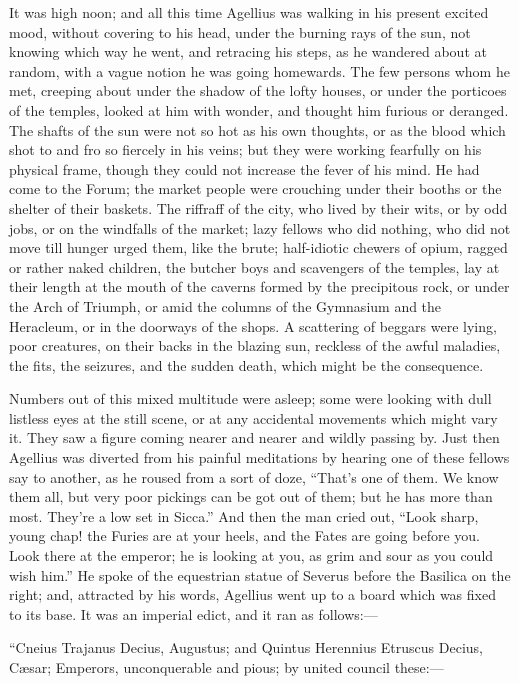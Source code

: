 It was high noon; and all this time Agellius was walking in his
present excited mood, without covering to his head, under the burning
rays of the sun, not knowing which way he went, and retracing his
steps, as he wandered about at random, with a vague notion he was
going homewards. The few persons whom he met, creeping about under the
shadow of the lofty houses, or under the porticoes of the temples,
looked at him with wonder, and thought him furious or deranged. The
shafts of the sun were not so hot as his own thoughts, or as the blood
which shot to and fro so fiercely in his veins; but they were working
fearfully on his physical frame, though they could not increase the
fever of his mind. He had come to the Forum; the market people were
crouching under their booths or the shelter of their baskets. The
riffraff of the city, who lived by their wits, or by odd jobs, or on
the windfalls of the market; lazy fellows who did nothing, who did not
move till hunger urged them, like the brute; half-idiotic chewers of
opium, ragged or rather naked children, the butcher boys and
scavengers of the temples, lay at their length at the mouth of the
caverns formed by the precipitous rock, or under the Arch of Triumph,
or amid the columns of the Gymnasium and the Heracleum, or in the
doorways of the shops. A scattering of beggars were lying, poor
creatures, on their backs in the blazing sun, reckless of the awful
maladies, the fits, the seizures, and the sudden death, which
might be the consequence.

Numbers out of this mixed multitude were asleep; some were looking
with dull listless eyes at the still scene, or at any accidental
movements which might vary it. They saw a figure coming nearer and
nearer and wildly passing by. Just then Agellius was diverted from his
painful meditations by hearing one of these fellows say to another, as
he roused from a sort of doze, ``That's one of them. We know them
all, but very poor pickings can be got out of them; but he has more
than most. They're a low set in Sicca.'' And then the man cried
out, ``Look sharp, young chap! the Furies are at your heels, and
the Fates are going before you. Look there at the emperor; he is
looking at you, as grim and sour as you could wish him.'' He spoke
of the equestrian statue of Severus before the Basilica on the right;
and, attracted by his words, Agellius went up to a board which was
fixed to its base. It was an imperial edict, and it ran as follows:—

``Cneius Trajanus Decius, Augustus; and Quintus Herennius
Etruscus Decius, Cæsar; Emperors, unconquerable and pious; by united
council these:—

